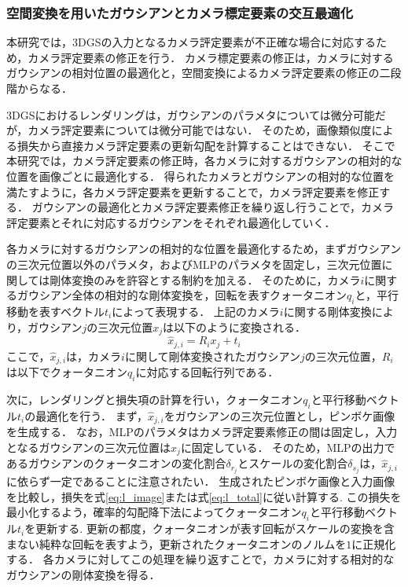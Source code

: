 \subsubsection{空間変換を用いたガウシアンとカメラ標定要素の交互最適化}\label{subsubsec:sequential_optimization}
本研究では，3DGSの入力となるカメラ評定要素が不正確な場合に対応するため，カメラ評定要素の修正を行う．
カメラ標定要素の修正は，カメラに対するガウシアンの相対位置の最適化と，空間変換によるカメラ評定要素の修正の二段階からなる．\par

3DGSにおけるレンダリングは，ガウシアンのパラメタについては微分可能だが，カメラ評定要素については微分可能ではない．
そのため，画像類似度による損失から直接カメラ評定要素の更新勾配を計算することはできない．
そこで本研究では，カメラ評定要素の修正時，各カメラに対するガウシアンの相対的な位置を画像ごとに最適化する．
得られたカメラとガウシアンの相対的な位置を満たすように，各カメラ評定要素を更新することで，カメラ評定要素を修正する．
ガウシアンの最適化とカメラ評定要素修正を繰り返し行うことで，カメラ評定要素とそれに対応するガウシアンをそれぞれ最適化していく．\par

各カメラに対するガウシアンの相対的な位置を最適化するため，まずガウシアンの三次元位置以外のパラメタ，およびMLPのパラメタを固定し，三次元位置に関しては剛体変換のみを許容とする制約を加える．
そのために，カメラ$i$に関するガウシアン全体の相対的な剛体変換を，回転を表すクォータニオン$q_i$と，平行移動を表すベクトル$t_i$によって表現する．
上記のカメラ$i$に関する剛体変換により，ガウシアン$j$の三次元位置$x_j$は以下のように変換される．
\begin{equation}
	\hat{x}_{j,i} = R_ix_j + t_i
\end{equation}
ここで，$\hat{x}_{j,i}$は，カメラ$i$に関して剛体変換されたガウシアン$j$の三次元位置，$R_i$は以下でクォータニオン$q_i$に対応する回転行列である． \par

次に，レンダリングと損失項の計算を行い，クォータニオン$q_i$と平行移動ベクトル$t_i$の最適化を行う．
まず，$\hat{x}_{j,i}$をガウシアンの三次元位置とし，ピンボケ画像を生成する．
なお，MLPのパラメタはカメラ評定要素修正の間は固定し，入力となるガウシアンの三次元位置は$x_j$に固定している．
そのため，MLPの出力であるガウシアンのクォータニオンの変化割合$\delta_{r_j}$とスケールの変化割合$\delta_{s_j}$は，$\hat{x}_{j,i}$に依らず一定であることに注意されたい．
生成されたピンボケ画像と入力画像を比較し，損失を式\ref{eq:l_image}または式\ref{eq:l_total}に従い計算する.
この損失を最小化するよう，確率的勾配降下法によってクォータニオン$q_i$と平行移動ベクトル$t_i$を更新する.
更新の都度，クォータニオンが表す回転がスケールの変換を含まない純粋な回転を表すよう，更新されたクォータニオンのノルムを$1$に正規化する．
各カメラに対してこの処理を繰り返すことで，カメラに対する相対的なガウシアンの剛体変換を得る．\par

